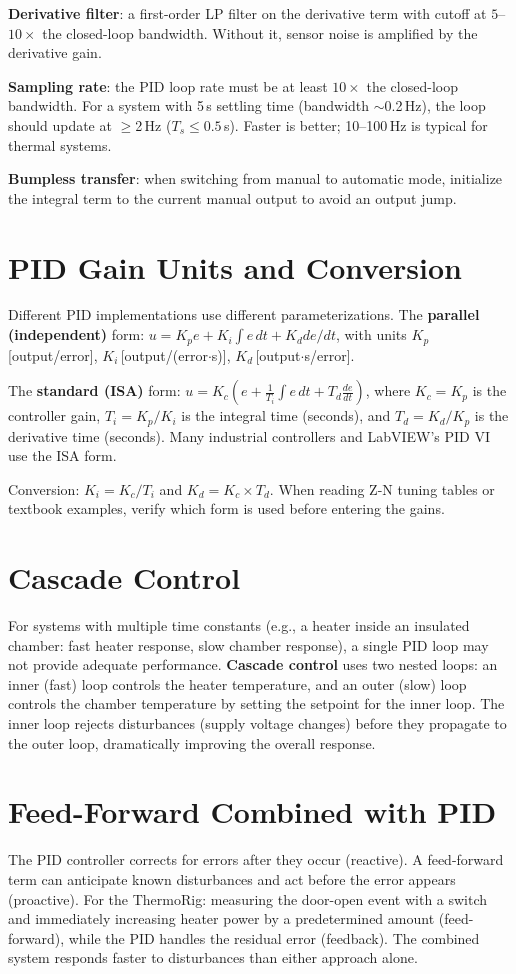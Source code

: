 \documentclass[11pt,letterpaper,twoside,openany]{book}
\begin{document}
\textbf{Derivative filter}: a first-order LP filter on the derivative term with cutoff at $5$--$10\times$ the closed-loop bandwidth. Without it, sensor noise is amplified by the derivative gain.

\textbf{Sampling rate}: the PID loop rate must be at least $10\times$ the closed-loop bandwidth. For a system with 5\,s settling time (bandwidth $\sim$0.2\,Hz), the loop should update at $\geq$2\,Hz ($T_s \leq 0.5$\,s). Faster is better; 10--100\,Hz is typical for thermal systems.

\textbf{Bumpless transfer}: when switching from manual to automatic mode, initialize the integral term to the current manual output to avoid an output jump.


\section{PID Gain Units and Conversion}
Different PID implementations use different parameterizations. The \textbf{parallel (independent)} form: $u = K_p e + K_i \int e\,dt + K_d de/dt$, with units $K_p$\,[output/error], $K_i$\,[output/(error$\cdot$s)], $K_d$\,[output$\cdot$s/error].

The \textbf{standard (ISA)} form: $u = K_c\left(e + \frac{1}{T_i}\int e\,dt + T_d \frac{de}{dt}\right)$, where $K_c = K_p$ is the controller gain, $T_i = K_p/K_i$ is the integral time (seconds), and $T_d = K_d/K_p$ is the derivative time (seconds). Many industrial controllers and LabVIEW's PID VI use the ISA form.

Conversion: $K_i = K_c/T_i$ and $K_d = K_c \times T_d$. When reading Z-N tuning tables or textbook examples, verify which form is used before entering the gains.

\section{Cascade Control}
For systems with multiple time constants (e.g., a heater inside an insulated chamber: fast heater response, slow chamber response), a single PID loop may not provide adequate performance. \textbf{Cascade control} uses two nested loops: an inner (fast) loop controls the heater temperature, and an outer (slow) loop controls the chamber temperature by setting the setpoint for the inner loop. The inner loop rejects disturbances (supply voltage changes) before they propagate to the outer loop, dramatically improving the overall response.

\section{Feed-Forward Combined with PID}
The PID controller corrects for errors after they occur (reactive). A feed-forward term can anticipate known disturbances and act before the error appears (proactive). For the ThermoRig: measuring the door-open event with a switch and immediately increasing heater power by a predetermined amount (feed-forward), while the PID handles the residual error (feedback). The combined system responds faster to disturbances than either approach alone.
\end{document}
